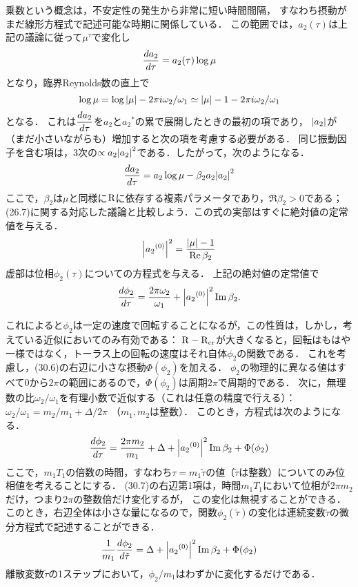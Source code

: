 乗数という概念は，不安定性の発生から非常に短い時間間隔，
すなわち摂動がまだ線形方程式で記述可能な時期に関係している．
この範囲では，$a_2(\tau)$は上記の議論に従って$\mu^\tau$で変化し 
\[
    \dv{a_2}{\tau} = a_2(\tau) \log\mu
\]
となり，臨界Reynolds数の直上で
\begin{equation}
    \log\mu = \log\abs{\mu} - 2\pi i \omega_2/\omega_1
    \simeq \abs{\mu}-1 - 2\pi i \omega_2/\omega_1
\end{equation}
となる．
これは$\ddv{a_2}{\tau}$を$a_2$と${a_2}^*$の累で展開したときの最初の項であり，
$\abs{a_2}$が（まだ小さいながらも）増加すると次の項を考慮する必要がある．
同じ振動因子を含む項は，3次の$\propto a_2\abs{a_2}^2$である．したがって，次のようになる．
\begin{equation}
    \dv{a_2}{\tau} = a_2\log\mu -\beta_2 a_2\abs{a_2}^2
\end{equation}
ここで，$\beta_2$は$\mu$と同様に$\mathrm{R}$に依存する複素パラメータであり，$\Re\beta_2>0$である；
(26.7)に関する対応した議論と比較しよう．この式の実部はすぐに絶対値の定常値を与える．
\[
    \vqty{{a_2}^{(0)}}^2 = \frac{\abs{\mu}-1}{\Re\beta_2}
\]
虚部は位相$\phi_2(\tau)$についての方程式を与える．
上記の絶対値の定常値で
\begin{equation}
    \dv{\phi_2}{\tau} = \frac{2\pi\omega_2}{\omega_1} + \vqty{{a_2}^{(0)}}^2 \Im\beta_2 .
\end{equation}




これによると$\phi_2$は一定の速度で回転することになるが，この性質は，しかし，考えている近似においてのみ有効である：
$\mathrm{R}-\mathrm{R}_{\mathrm{cr}}$が大きくなると，回転はもはや一様ではなく，トーラス上の回転の速度はそれ自体$\phi_2$の関数である．
これを考慮し，(30.6)の右辺に小さな摂動$\Phi(\phi_2)$を加える．
$\phi_2$の物理的に異なる値はすべて0から$2\pi$の範囲にあるので，$\Phi(\phi_2)$は周期$2\pi$で周期的である．
次に，無理数の比$\omega_2/\omega_1$を有理小数で近似する（これは任意の精度で行える）：
$\omega_2/\omega_1=m_2/m_1 + \Delta/2\pi$
（$m_1,m_2$は整数）．
このとき，方程式は次のようになる．
\begin{equation}
    \dv{\phi_2}{\tau} = \frac{2\pi m_2}{m_1} + \Delta + \vqty{{a_2}^{(0)}}^2 \Im\beta_2 + \Phi(\phi_2)
\end{equation}
ここで，$m_1T_1$の倍数の時間，すなわち$\tau=m_1\tilde{\tau}$の値（$\tilde{\tau}$は整数）についてのみ位相値を考えることにする．
(30.7)の右辺第1項は，時間$m_1T_1$において位相が$2\pi m_2$だけ，つまり$2\pi$の整数倍だけ変化するが，
この変化は無視することができる．
このとき，右辺全体は小さな量になるので，関数$\phi_2(\tilde{\tau})$の変化は連続変数$\tilde{\tau}$の微分方程式で記述することができる．
\begin{equation}\label{eq30.8:φ_2(τ)の微分方程式}
    \frac{1}{m_1} \dv{\phi_2}{\tilde{\tau}} = \Delta + \vqty{{a_2}^{(0)}}^2 \Im\beta_2 + \Phi(\phi_2)
\end{equation}
離散変数$\tilde{\tau}$の1ステップにおいて，$\phi_2/m_1$はわずかに変化するだけである．



